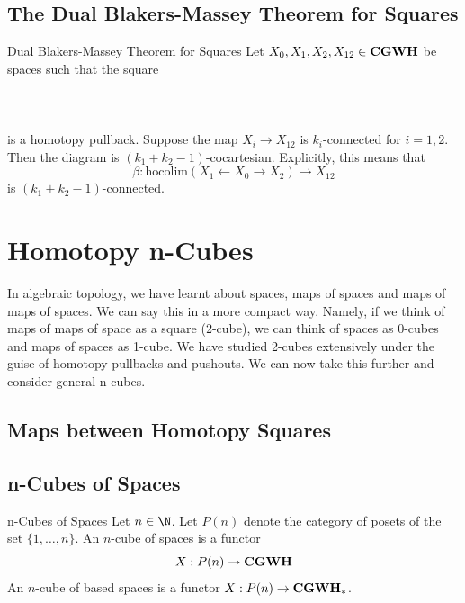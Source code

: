 \documentclass[a4paper]{article}
\begin{document}
\subsection{The Dual Blakers-Massey Theorem for Squares}
\begin{thm}{Dual Blakers-Massey Theorem for Squares}{} Let $X_0,X_1,X_2,X_{12}\in\bold{CGWH}$ be spaces such that the square \\~\\
\\~\\
is a homotopy pullback. Suppose the map $X_i\to X_{12}$ is $k_i$-connected for $i=1,2$. Then the diagram is $(k_1+k_2-1)$-cocartesian. Explicitly, this means that $$\beta:\text{hocolim}(X_1\leftarrow X_0\rightarrow X_2)\to X_{12}$$ is $(k_1+k_2-1)$-connected.
\end{thm}

\pagebreak
\section{Homotopy n-Cubes}
In algebraic topology, we have learnt about spaces, maps of spaces and maps of maps of spaces. We can say this in a more compact way. Namely, if we think of maps of maps of space as a square (2-cube), we can think of spaces as 0-cubes and maps of spaces as 1-cube. We have studied 2-cubes extensively under the guise of homotopy pullbacks and pushouts. We can now take this further and consider general n-cubes. 

\subsection{Maps between Homotopy Squares}

\subsection{n-Cubes of Spaces}
\begin{defn}{n-Cubes of Spaces}{} Let $n\in\N$. Let $P(n)$ denote the category of posets of the set $\{1,\dots,n\}$. An $n$-cube of spaces is a functor $$X:P(n)\to\bold{CGWH}$$ An $n$-cube of based spaces is a functor $X:P(n)\to\bold{CGWH}_\ast$. 
\end{defn}
\end{document}
